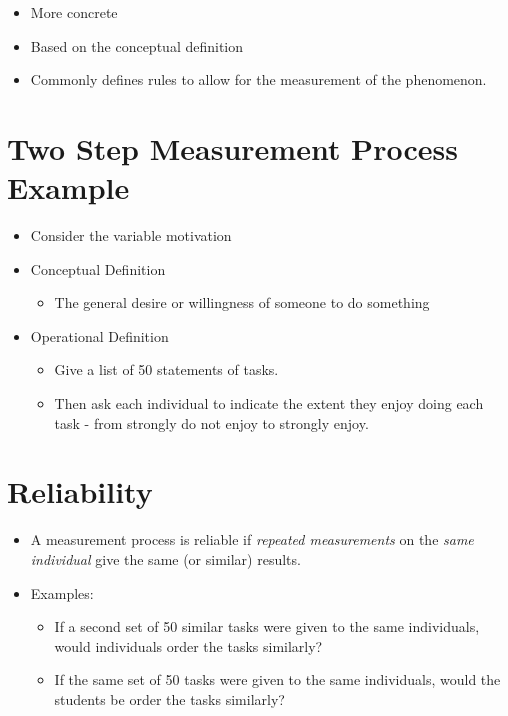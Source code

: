 \documentclass[12pt]{article}
\begin{document}
\begin{itemize}
\itemsep1pt\parskip0pt
\item
  More concrete
\item
  Based on the conceptual definition
\item
  Commonly defines rules to allow for the measurement of the phenomenon.
\end{itemize}

\section{Two Step Measurement Process
Example}\label{two-step-measurement-process-example}

\begin{itemize}
\itemsep1pt\parskip0pt
\item
  Consider the variable motivation
\item
  Conceptual Definition

  \begin{itemize}
  \itemsep1pt\parskip0pt
  \item
    The general desire or willingness of someone to do something
  \end{itemize}
\item
  Operational Definition

  \begin{itemize}
  \itemsep1pt\parskip0pt
  \item
    Give a list of 50 statements of tasks.
  \item
    Then ask each individual to indicate the extent they enjoy doing
    each task - from strongly do not enjoy to strongly enjoy.
  \end{itemize}
\end{itemize}

\section{Reliability}\label{reliability}

\begin{itemize}
\itemsep1pt\parskip0pt
\item
  A measurement process is reliable if \emph{repeated measurements} on
  the \emph{same individual} give the same (or similar) results.
\item
  Examples:

  \begin{itemize}
  \itemsep1pt\parskip0pt
  \item
    If a second set of 50 similar tasks were given to the same
    individuals, would individuals order the tasks similarly?
  \item
    If the same set of 50 tasks were given to the same individuals,
    would the students be order the tasks similarly?
  \end{itemize}
\end{itemize}
\end{document}
